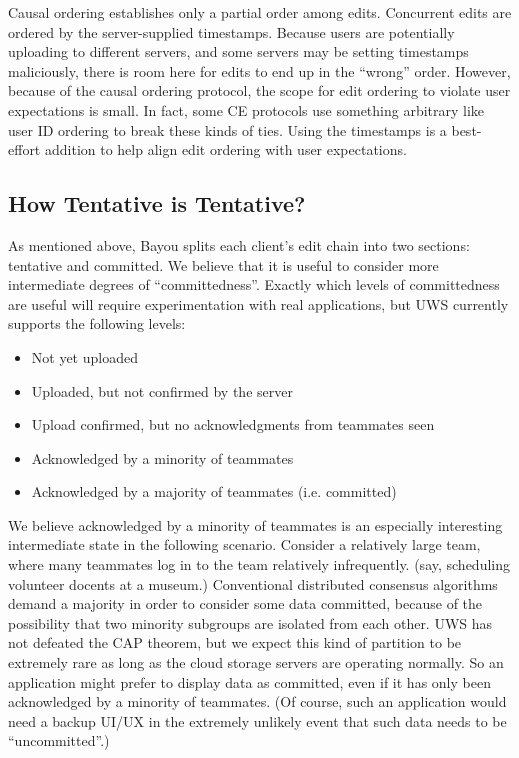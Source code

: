 \documentclass[runningheads]{llncs}
\begin{document}
Causal ordering establishes only a partial order among edits.
Concurrent edits are ordered by the server-supplied timestamps.
Because users are potentially uploading to different servers, and some servers may be setting timestamps maliciously, there is room here for edits to end up in the ``wrong'' order.
However, because of the causal ordering protocol, the scope for edit ordering to violate user expectations is small.
In fact, some CE protocols use something arbitrary like user ID ordering to break these kinds of ties.
Using the timestamps is a best-effort addition to help align edit ordering with user expectations.

\subsection{How Tentative is Tentative?}

As mentioned above, Bayou splits each client's edit chain into two sections: tentative and committed.
We believe that it is useful to consider more intermediate degrees of ``committedness''.
Exactly which levels of committedness are useful will require experimentation with real applications, but UWS currently supports the following levels:

\begin{itemize}
\item Not yet uploaded
\item Uploaded, but not confirmed by the server
\item Upload confirmed, but no acknowledgments from teammates seen
\item Acknowledged by a minority of teammates
\item Acknowledged by a majority of teammates (i.e. committed)
\end{itemize}

We believe acknowledged by a minority of teammates is an especially interesting intermediate state in the following scenario.
Consider a relatively large team, where many teammates log in to the team relatively infrequently.
(say, scheduling volunteer docents at a museum.)
Conventional distributed consensus algorithms demand a majority in order to consider some data committed, because of the possibility that two minority subgroups are isolated from each other.
UWS has not defeated the CAP theorem, but we expect this kind of partition to be extremely rare as long as the cloud storage servers are operating normally.
So an application might prefer to display data as committed, even if it has only been acknowledged by a minority of teammates.
(Of course, such an application would need a backup UI{\slash}UX in the extremely unlikely event that such data needs to be ``uncommitted''.)
\end{document}
